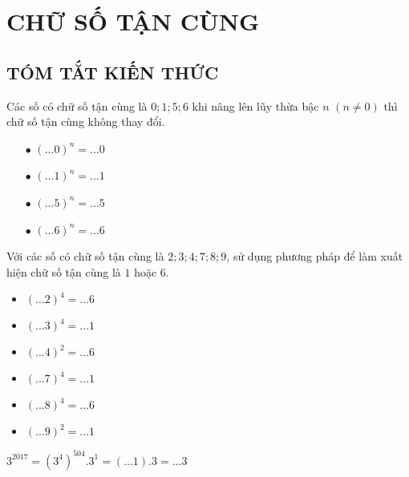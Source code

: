 \section{CHỮ SỐ TẬN CÙNG}
\subsection{TÓM TẮT KIẾN THỨC}
\begin{tomtat}

Các số có chữ số tận cùng là $0; 1; 5; 6$ khi nâng lên lũy thừa bậc $n$ $(n \ne 0)$ thì chữ số tận cùng không thay đổi.
\begin{multicols}{2}
\begin{itemize}
\vspace{-0,5cm}
\item[$\bullet$] ${(...0)^n}=...0$
\item[$\bullet$] ${(...1)^n}=...1$
\item[$\bullet$] ${(...5)^n}=...5$
\item[$\bullet$] ${(...6)^n}=...6$
\end{itemize}
\end{multicols}
Với các số có chữ số tận cùng là $2; 3; 4; 7; 8; 9$, sử dụng phương pháp để làm xuất hiện chữ số tận cùng là $1$ hoặc $6$.
\begin{multicols}{2}
\begin{itemize}
\vspace{-0,5cm}
\item ${(...2)^4}=...6$
\item ${(...3)^4}=...1$
\item ${(...4)^2}=...6$
\item ${(...7)^4}=...1$
\item ${(...8)^4}=...6$
\item ${(...9)^2}=...1$
\end{itemize}
\end{multicols}

\begin{vd}
${3^{2017}} = {\left( {{3^4}} \right)^{504}}{.3^1} = \left( {...1} \right).3 = ...3$
\end{vd}
\end{tomtat}

